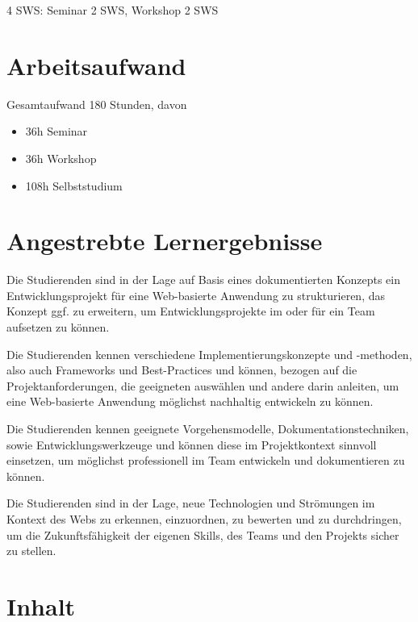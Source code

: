 4 SWS: Seminar 2 SWS, Workshop 2 SWS

\section*{Arbeitsaufwand\label{/mi-2017/modulbeschreibungen-master/MA_WTW_Modul_Web-Technologien}}\label{arbeitsaufwandpathlabelmi-2017modulbeschreibungen-mastermaux5fwtwux5fmodulux5fweb-technologien}

Gesamtaufwand 180 Stunden, davon

\begin{itemize}
\tightlist
\item
  36h Seminar
\item
  36h Workshop
\item
  108h Selbststudium
\end{itemize}

\section*{Angestrebte
Lernergebnisse\label{/mi-2017/modulbeschreibungen-master/MA_WTW_Modul_Web-Technologien}}\label{angestrebte-lernergebnissepathlabelmi-2017modulbeschreibungen-mastermaux5fwtwux5fmodulux5fweb-technologien}

Die Studierenden sind in der Lage auf Basis eines dokumentierten
Konzepts ein Entwicklungsprojekt für eine Web-basierte Anwendung zu
strukturieren, das Konzept ggf. zu erweitern, um Entwicklungsprojekte im
oder für ein Team aufsetzen zu können.

Die Studierenden kennen verschiedene Implementierungskonzepte und
-methoden, also auch Frameworks und Best-Practices und können, bezogen
auf die Projektanforderungen, die geeigneten auswählen und andere darin
anleiten, um eine Web-basierte Anwendung möglichst nachhaltig entwickeln
zu können.

Die Studierenden kennen geeignete Vorgehensmodelle,
Dokumentationstechniken, sowie Entwicklungswerkzeuge und können diese im
Projektkontext sinnvoll einsetzen, um möglichst professionell im Team
entwickeln und dokumentieren zu können.

Die Studierenden sind in der Lage, neue Technologien und Strömungen im
Kontext des Webs zu erkennen, einzuordnen, zu bewerten und zu
durchdringen, um die Zukunftsfähigkeit der eigenen Skills, des Teams und
den Projekts sicher zu stellen.

\section*{Inhalt\label{/mi-2017/modulbeschreibungen-master/MA_WTW_Modul_Web-Technologien}}\label{inhaltpathlabelmi-2017modulbeschreibungen-mastermaux5fwtwux5fmodulux5fweb-technologien}

